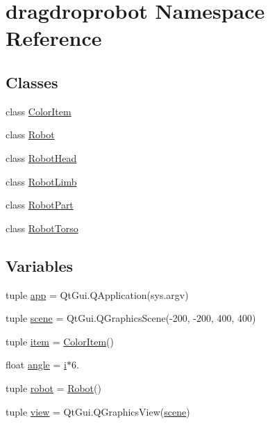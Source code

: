 \hypertarget{namespacedragdroprobot}{}\section{dragdroprobot Namespace Reference}
\label{namespacedragdroprobot}
\subsection*{Classes}
\begin{DoxyCompactItemize}
\item 
class \hyperlink{classdragdroprobot_1_1ColorItem}{Color\+Item}
\item 
class \hyperlink{classdragdroprobot_1_1Robot}{Robot}
\item 
class \hyperlink{classdragdroprobot_1_1RobotHead}{Robot\+Head}
\item 
class \hyperlink{classdragdroprobot_1_1RobotLimb}{Robot\+Limb}
\item 
class \hyperlink{classdragdroprobot_1_1RobotPart}{Robot\+Part}
\item 
class \hyperlink{classdragdroprobot_1_1RobotTorso}{Robot\+Torso}
\end{DoxyCompactItemize}
\subsection*{Variables}
\begin{DoxyCompactItemize}
\item 
tuple \hyperlink{namespacedragdroprobot_a18b417c946f7007c53deddcb96137219}{app} = Qt\+Gui.\+Q\+Application(sys.\+argv)
\item 
tuple \hyperlink{namespacedragdroprobot_a7d111d9dd0962512b83974b850387a1c}{scene} = Qt\+Gui.\+Q\+Graphics\+Scene(-\/200, -\/200, 400, 400)
\item 
tuple \hyperlink{namespacedragdroprobot_a850fdc111a8a5222976694c1e8a7727d}{item} = \hyperlink{classdragdroprobot_1_1ColorItem}{Color\+Item}()
\item 
float \hyperlink{namespacedragdroprobot_addd88cde04ffea0df28abd28bae2d2c4}{angle} = \hyperlink{indexexpr_8h_aabd77643995707c185e95c8cb2782c81}{i}$\ast$6.
\item 
tuple \hyperlink{namespacedragdroprobot_a6203faed027850ae88dc75bf58316b6e}{robot} = \hyperlink{classdragdroprobot_1_1Robot}{Robot}()
\item 
tuple \hyperlink{namespacedragdroprobot_a14fd3f9b1d3a85c32220c4414941ccb1}{view} = Qt\+Gui.\+Q\+Graphics\+View(\hyperlink{namespacedragdroprobot_a7d111d9dd0962512b83974b850387a1c}{scene})
\end{DoxyCompactItemize}


